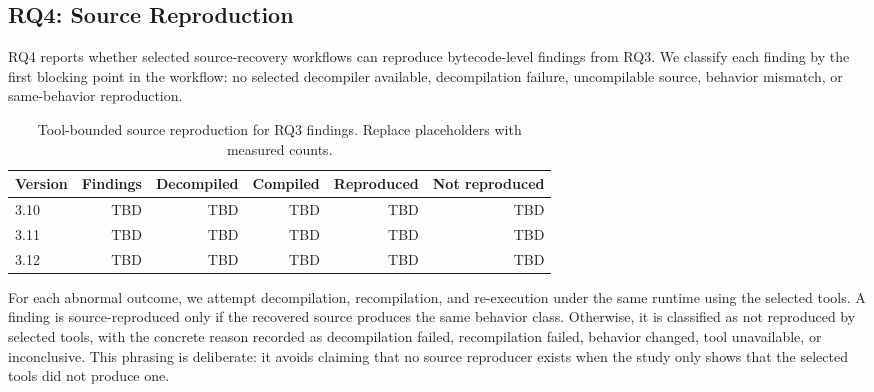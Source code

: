 




\subsection{RQ4: Source Reproduction}\label{sec:eval:runtime}

RQ4 reports whether selected source-recovery workflows can reproduce bytecode-level findings from RQ3.  We classify each finding by the first blocking point in the workflow: no selected decompiler available, decompilation failure, uncompilable source, behavior mismatch, or same-behavior reproduction.

\begin{table}[t]
  \centering
  \caption{Tool-bounded source reproduction for RQ3 findings. Replace placeholders with measured counts.}
  \label{tab:source-reproduction}
  \begin{tabular}{lrrrrr}
    \toprule
    Version & Findings & Decompiled & Compiled & Reproduced & Not reproduced \\
    \midrule
    3.10 & TBD & TBD & TBD & TBD & TBD \\
    3.11 & TBD & TBD & TBD & TBD & TBD \\
    3.12 & TBD & TBD & TBD & TBD & TBD \\
    \bottomrule
  \end{tabular}
\end{table}

For each abnormal outcome, we attempt decompilation, recompilation, and re-execution under the same runtime using the selected tools.  A finding is source-reproduced only if the recovered source produces the same behavior class.  Otherwise, it is classified as not reproduced by selected tools, with the concrete reason recorded as decompilation failed, recompilation failed, behavior changed, tool unavailable, or inconclusive.  This phrasing is deliberate: it avoids claiming that no source reproducer exists when the study only shows that the selected tools did not produce one.
